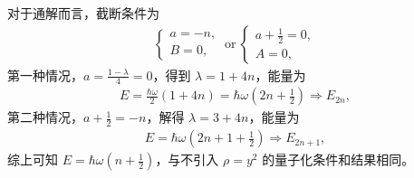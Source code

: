 对于通解而言，截断条件为
\begin{align}
    \begin{cases}
        a = -n,\\B= 0,
    \end{cases}\ \text{or} \
    \begin{cases}
        a+\frac12=0,\\
        A=0,
    \end{cases}
\end{align}
第一种情况，$a = \frac{1-\lambda}4 = 0$，得到 $\lambda = 1+4n$，能量为
\begin{align}
    E = \frac{\hbar\omega}2 (1+4n) = \hbar\omega\left(2n+\frac12\right) \Rightarrow E_{2n},
\end{align}
第二种情况，$a+\frac12 = -n$，解得 $\lambda = 3+4n$，能量为
\begin{align}
    E = \hbar\omega\left(2n+1+\frac12\right) \Rightarrow E_{2n+1},
\end{align}
综上可知 $E = \hbar\omega \left(n + \frac12\right)$，与不引入 $\rho = y^2$ 的量子化条件和结果相同。

